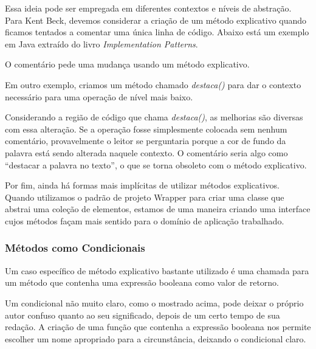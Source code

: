Essa ideia pode ser empregada em diferentes contextos e níveis de abstração. Para Kent Beck, devemos considerar a criação de um método explicativo quando ficamos tentados a comentar uma única linha de código. Abaixo está um exemplo em Java extraído do livro \textit{Implementation Patterns}.



O comentário pede uma mudança usando um método explicativo.
	


Em outro exemplo, criamos um método chamado \textit{destaca()} para dar o contexto necessário para uma operação de nível mais baixo. 



Considerando a região de código que chama \textit{destaca()}, as melhorias são diversas com essa alteração. Se a operação fosse simplesmente colocada sem nenhum comentário, provavelmente o leitor se perguntaria porque a cor de fundo da palavra está sendo alterada naquele contexto. O comentário seria algo como “destacar a palavra no texto”, o que se torna obsoleto com o método explicativo. 

Por fim, ainda há formas mais implícitas de utilizar métodos explicativos. Quando utilizamos o padrão de projeto Wrapper \citep{GOF95} para criar uma classe que abstrai uma coleção de elementos, estamos de uma maneira criando uma interface cujos métodos façam mais sentido para o domínio de aplicação trabalhado.

\subsubsection{Métodos como Condicionais}
\label{metodos:condicionais}
Um caso específico de método explicativo bastante utilizado é uma chamada para um método que contenha uma expressão booleana como valor de retorno.
	


Um condicional não muito claro, como o mostrado acima, pode deixar o próprio autor confuso quanto ao seu significado, depois de um certo tempo de sua redação. A criação de uma função que contenha a expressão booleana nos permite escolher um nome apropriado para a circunstância, deixando o condicional claro.

